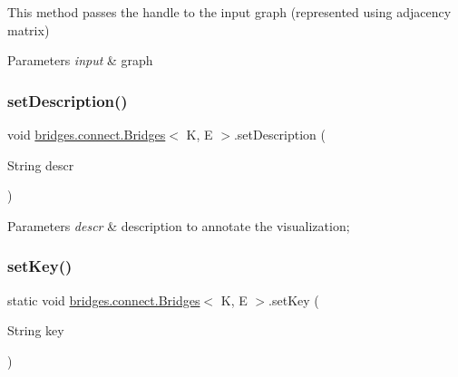 This method passes the handle to the input graph (represented using adjacency matrix)


\begin{DoxyParams}{Parameters}
{\em input} & graph \\
\hline
\end{DoxyParams}
\hypertarget{classbridges_1_1connect_1_1_bridges_a161206b37c2acdf435f4444679616eec}{}\label{classbridges_1_1connect_1_1_bridges_a161206b37c2acdf435f4444679616eec} 
\subsubsection{\texorpdfstring{set\+Description()}{setDescription()}}
{\footnotesize\ttfamily void \hyperlink{classbridges_1_1connect_1_1_bridges}{bridges.\+connect.\+Bridges}$<$ K, E $>$.set\+Description (\begin{DoxyParamCaption}\item[{String}]{descr }\end{DoxyParamCaption})}


\begin{DoxyParams}{Parameters}
{\em descr} & description to annotate the visualization; \\
\hline
\end{DoxyParams}
\hypertarget{classbridges_1_1connect_1_1_bridges_a484992ce3fce273ca2caa215a4488e3c}{}\label{classbridges_1_1connect_1_1_bridges_a484992ce3fce273ca2caa215a4488e3c} 
\subsubsection{\texorpdfstring{set\+Key()}{setKey()}}
{\footnotesize\ttfamily static void \hyperlink{classbridges_1_1connect_1_1_bridges}{bridges.\+connect.\+Bridges}$<$ K, E $>$.set\+Key (\begin{DoxyParamCaption}\item[{String}]{key }\end{DoxyParamCaption})\hspace{0.3cm}{\ttfamily [static]}}

\hypertarget{classbridges_1_1connect_1_1_bridges_aa05295718a1fefa2917dbaf874c79415}{}\label{classbridges_1_1connect_1_1_bridges_aa05295718a1fefa2917dbaf874c79415} 
